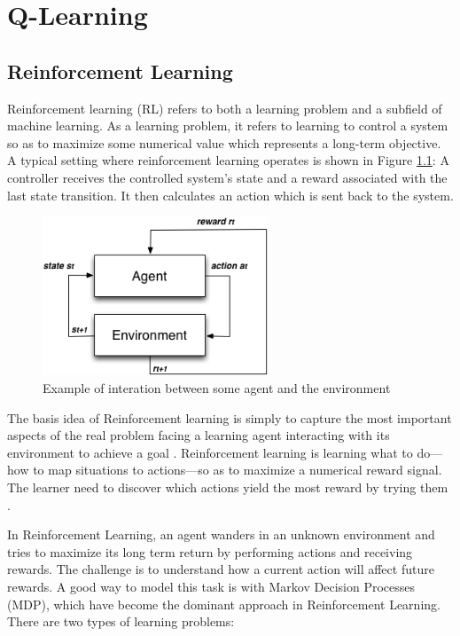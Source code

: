 \chapter{Q-Learning}




\section{Reinforcement Learning}

Reinforcement learning (RL) refers to both a learning problem and a subfield of machine
learning. As a learning problem, it refers to learning to control a system so as to maximize
some numerical value which represents a long-term objective. A typical setting where
reinforcement learning operates is shown in Figure \ref{fig:agentenv}: A controller receives the controlled
system’s state and a reward associated with the last state transition. It then calculates an
action which is sent back to the system.


\begin{figure}
\centering
\includegraphics[width=0.6\textwidth]{./images/agentenv.png}
\caption{Example of interation between some agent and the environment}
\label{fig:agentenv}
\end{figure}


The basis idea of Reinforcement learning  is simply to capture the most important aspects of the real problem facing a learning agent interacting with its environment to achieve a goal \cite{Sutton2012}. Reinforcement learning is learning what to do—how to map situations to actions—so as to maximize a numerical reward signal. The learner need to discover which actions yield the most reward by trying them \cite{Sutton2012}.

In Reinforcement Learning, an agent wanders in an unknown environment and tries to maximize its long term return by performing actions and receiving rewards. The challenge is to understand how a current action will affect future rewards. A good way to model this task is with Markov Decision Processes (MDP), which have become the dominant approach in Reinforcement Learning. There are two types of learning problems:


